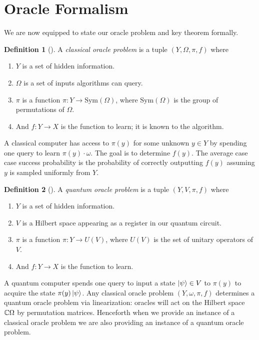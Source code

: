 \documentclass[12pt,twoside]{reedthesis}
\theoremstyle{plain}   %
\theoremstyle{definition}
\newtheorem{defn}{Definition}[section]
\theoremstyle{remark}
\numberwithin{equation}{section}
\def\Sym{\mathrm{Sym}}
\begin{document}
  \section{Oracle Formalism}
  We are now equipped to state our oracle problem and key theorem formally.
  \begin{defn}[{\cite[Section 2]{copeland}}]
    A \emph{classical oracle problem} is a tuple $(Y, \Omega, \pi, f)$ where
    \begin{enumerate}
    \item $Y$ is a set of hidden information.
    \item $\Omega$ is a set of inputs algorithms can query.
    \item $\pi$ is a function $\pi: Y \to \Sym(\Omega )$, where $\Sym(\Omega)$ is the group of permutations of $\Omega$.
    \item And $f: Y \to X$ is the function to learn; it is known to the algorithm. 
    \end{enumerate}
    A classical computer has access to $\pi(y)$ for some unknown $y \in Y$ by spending one query to learn $\pi(y) \cdot \omega$.
    The goal is to determine $f(y)$.
    The average case case success probability is the probability of correctly outputting $f(y)$ assuming $y$ is sampled uniformly from $Y$.
  \end{defn}
  \begin{defn}[{\cite[Section 2]{copeland}}]
    A \emph{quantum oracle problem} is a tuple $(Y, V, \pi, f)$ where
    \begin{enumerate}
    \item $Y$ is a set of hidden information.
    \item $V$ is a Hilbert space appearing as a register in our quantum circuit.
    \item $\pi$ is a function $\pi: Y \to U(V)$, where $U(V)$ is the set of unitary operators of $V$.
    \item And $f: Y \to X$ is the function to learn.
    \end{enumerate}
    A quantum computer spends one query to input a state $\ket{\psi} \in V$ to $\pi(y)$ to acquire the state $\pi(y) \ket{\psi}$.
    Any classical oracle problem $(Y,\omega, \pi, f)$ determines a quantum oracle problem via linearization:
    oracles will act on the Hilbert space $\mathbb{C} \Omega$  by permutation matrices.
    Henceforth when we provide an instance of a classical oracle problem we are also providing an instance of a quantum oracle problem.
  \end{defn}
\end{document}
